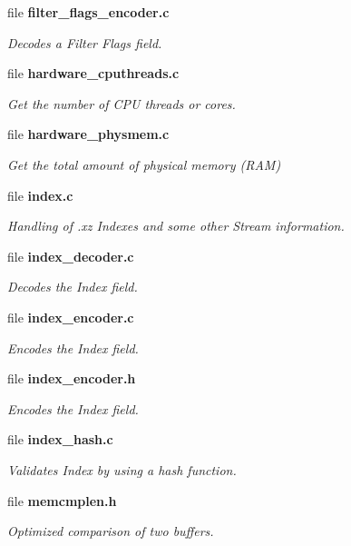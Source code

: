 \begin{DoxyCompactItemize}
file \textbf{ filter\+\_\+flags\+\_\+encoder.\+c}
\begin{DoxyCompactList}\small\item\em Decodes a Filter Flags field. \end{DoxyCompactList}\item 
file \textbf{ hardware\+\_\+cputhreads.\+c}
\begin{DoxyCompactList}\small\item\em Get the number of C\+PU threads or cores. \end{DoxyCompactList}\item 
file \textbf{ hardware\+\_\+physmem.\+c}
\begin{DoxyCompactList}\small\item\em Get the total amount of physical memory (R\+AM) \end{DoxyCompactList}\item 
file \textbf{ index.\+c}
\begin{DoxyCompactList}\small\item\em Handling of .xz Indexes and some other Stream information. \end{DoxyCompactList}\item 
file \textbf{ index\+\_\+decoder.\+c}
\begin{DoxyCompactList}\small\item\em Decodes the Index field. \end{DoxyCompactList}\item 
file \textbf{ index\+\_\+encoder.\+c}
\begin{DoxyCompactList}\small\item\em Encodes the Index field. \end{DoxyCompactList}\item 
file \textbf{ index\+\_\+encoder.\+h}
\begin{DoxyCompactList}\small\item\em Encodes the Index field. \end{DoxyCompactList}\item 
file \textbf{ index\+\_\+hash.\+c}
\begin{DoxyCompactList}\small\item\em Validates Index by using a hash function. \end{DoxyCompactList}\item 
file \textbf{ memcmplen.\+h}
\begin{DoxyCompactList}\small\item\em Optimized comparison of two buffers. \end{DoxyCompactList}\item 

\end{DoxyCompactItemize}
